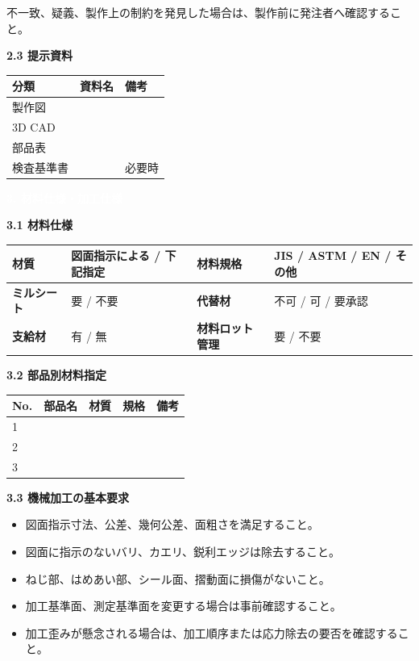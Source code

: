 \documentclass[a4paper,10pt]{ltjsarticle}
\makeatletter
\newlength{\SpecBodyWidth}
\newcommand{\PageTitle}[1]{%
  \vspace*{2mm}%
  \noindent\colorbox{SpecHead}{%
    \parbox{\dimexpr\SpecBodyWidth-2\fboxsep\relax}{%
      \large\bfseries\textcolor{white}{#1}%
    }%
  }%
  \par\vspace{5mm}%
}
\newcommand{\BlockTitle}[1]{%
  \vspace{4mm}%
  \noindent\colorbox{SpecSoft}{%
    \parbox{\dimexpr\SpecBodyWidth-2\fboxsep\relax}{%
      \normalsize\bfseries\textcolor{SpecHead}{#1}%
    }%
  }%
  \par\vspace{1.5mm}%
}
\newcommand{\Note}[1]{%
  \vspace{1.5mm}%
  \noindent\fbox{%
    \parbox{\dimexpr\SpecBodyWidth-2\fboxsep-2\fboxrule\relax}{%
      \footnotesize\textcolor{SpecMuted}{#1}%
    }%
  }%
  \par\vspace{1.5mm}%
}
\newenvironment{SpecTable}[1]{%
  \par\vspace{1mm}%
  \noindent\footnotesize%
  \renewcommand{\arraystretch}{1.10}%
  \setlength{\tabcolsep}{3.0pt}%
  \begin{tabular*}{\SpecBodyWidth}{@{\extracolsep{\fill}}#1@{}}%
}{%
  \end{tabular*}%
  \par\vspace{1.5mm}%
}
\newcommand{\Head}[1]{\textbf{\textcolor{SpecHead}{#1}}}
\newcommand{\Lab}[1]{\textbf{\textcolor{SpecHead}{#1}}}
\newcommand{\YN}{要 / 不要}
\makeatother
\begin{document}
{\footnotesize\textcolor{SpecMuted}{不一致、疑義、製作上の制約を発見した場合は、製作前に発注者へ確認すること。}}

\BlockTitle{2.3 提示資料}
\begin{SpecTable}{|p{34mm}|p{58mm}|p{54mm}|}
\hline
\Head{分類} & \Head{資料名} & \Head{備考} \\
\hline
製作図 &  &  \\
\hline
3D CAD &  &  \\
\hline
部品表 &  &  \\
\hline
検査基準書 &  & 必要時 \\
\hline
\end{SpecTable}

\clearpage

\PageTitle{3. 材料仕様・加工仕様}

\BlockTitle{3.1 材料仕様}
\begin{SpecTable}{|p{28mm}|p{43mm}|p{30mm}|p{43mm}|}
\hline
\Lab{材質} & 図面指示による / 下記指定 & \Lab{材料規格} & JIS / ASTM / EN / その他 \\
\hline
\Lab{ミルシート} & \YN & \Lab{代替材} & 不可 / 可 / 要承認 \\
\hline
\Lab{支給材} & 有 / 無 & \Lab{材料ロット管理} & \YN \\
\hline
\end{SpecTable}
\Note{代替材を提案する場合は、機械的性質、耐食性、熱処理性、溶接性、寸法安定性への影響を明記し、発注者の承認を得ること。}

\BlockTitle{3.2 部品別材料指定}
\begin{SpecTable}{|p{9mm}|p{48mm}|p{30mm}|p{30mm}|p{29mm}|}
\hline
\Head{No.} & \Head{部品名} & \Head{材質} & \Head{規格} & \Head{備考} \\
\hline
1 &  &  &  &  \\
\hline
2 &  &  &  &  \\
\hline
3 &  &  &  &  \\
\hline
\end{SpecTable}

\BlockTitle{3.3 機械加工の基本要求}
\begin{itemize}
  \item 図面指示寸法、公差、幾何公差、面粗さを満足すること。
  \item 図面に指示のないバリ、カエリ、鋭利エッジは除去すること。
  \item ねじ部、はめあい部、シール面、摺動面に損傷がないこと。
  \item 加工基準面、測定基準面を変更する場合は事前確認すること。
  \item 加工歪みが懸念される場合は、加工順序または応力除去の要否を確認すること。
\end{itemize}
\end{document}
